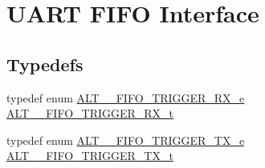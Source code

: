\hypertarget{group__UART__FIFO}{}\section{U\+A\+RT F\+I\+FO Interface}
\label{group__UART__FIFO}
\subsection*{Typedefs}
\begin{DoxyCompactItemize}
\item 
typedef enum \mbox{\hyperlink{group__UART__FIFO_ga2bfcdb68fa8def11f82daafbdab9b32c}{A\+L\+T\+\_\+\_\+\+F\+I\+F\+O\+\_\+\+T\+R\+I\+G\+G\+E\+R\+\_\+\+R\+X\+\_\+e}} \mbox{\hyperlink{group__UART__FIFO_ga6f6aa621e8111510517b92f57eb0987a}{A\+L\+T\+\_\+\_\+\+F\+I\+F\+O\+\_\+\+T\+R\+I\+G\+G\+E\+R\+\_\+\+R\+X\+\_\+t}}
\item 
typedef enum \mbox{\hyperlink{group__UART__FIFO_gaeef8e1e6b4ec8b82200067bf4ba2e04e}{A\+L\+T\+\_\+\_\+\+F\+I\+F\+O\+\_\+\+T\+R\+I\+G\+G\+E\+R\+\_\+\+T\+X\+\_\+e}} \mbox{\hyperlink{group__UART__FIFO_gac427c853fffa7be41f636f723b48a2e7}{A\+L\+T\+\_\+\_\+\+F\+I\+F\+O\+\_\+\+T\+R\+I\+G\+G\+E\+R\+\_\+\+T\+X\+\_\+t}}
\end{DoxyCompactItemize}
